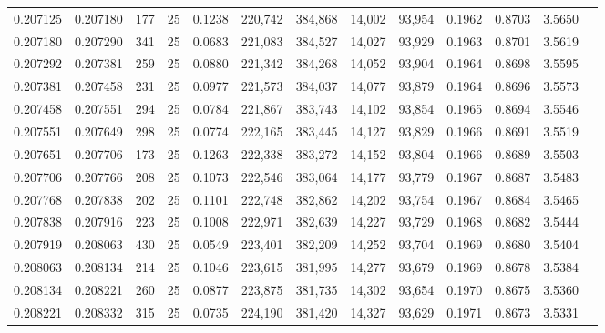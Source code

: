 \begin{tabular}{rrrrrrrrrrrrr}
0.207125 & 0.207180 &   177 &  25 &                                     0.1238 & 220,742 & 384,868 &  14,002 &  93,954 & 0.1962 & 0.8703 & 3.5650 \\
0.207180 & 0.207290 &   341 &  25 &                                     0.0683 & 221,083 & 384,527 &  14,027 &  93,929 & 0.1963 & 0.8701 & 3.5619 \\
0.207292 & 0.207381 &   259 &  25 &                                     0.0880 & 221,342 & 384,268 &  14,052 &  93,904 & 0.1964 & 0.8698 & 3.5595 \\
0.207381 & 0.207458 &   231 &  25 &                                     0.0977 & 221,573 & 384,037 &  14,077 &  93,879 & 0.1964 & 0.8696 & 3.5573 \\
0.207458 & 0.207551 &   294 &  25 &                                     0.0784 & 221,867 & 383,743 &  14,102 &  93,854 & 0.1965 & 0.8694 & 3.5546 \\
0.207551 & 0.207649 &   298 &  25 &                                     0.0774 & 222,165 & 383,445 &  14,127 &  93,829 & 0.1966 & 0.8691 & 3.5519 \\
0.207651 & 0.207706 &   173 &  25 &                                     0.1263 & 222,338 & 383,272 &  14,152 &  93,804 & 0.1966 & 0.8689 & 3.5503 \\
0.207706 & 0.207766 &   208 &  25 &                                     0.1073 & 222,546 & 383,064 &  14,177 &  93,779 & 0.1967 & 0.8687 & 3.5483 \\
0.207768 & 0.207838 &   202 &  25 &                                     0.1101 & 222,748 & 382,862 &  14,202 &  93,754 & 0.1967 & 0.8684 & 3.5465 \\
0.207838 & 0.207916 &   223 &  25 &                                     0.1008 & 222,971 & 382,639 &  14,227 &  93,729 & 0.1968 & 0.8682 & 3.5444 \\
0.207919 & 0.208063 &   430 &  25 &                                     0.0549 & 223,401 & 382,209 &  14,252 &  93,704 & 0.1969 & 0.8680 & 3.5404 \\
0.208063 & 0.208134 &   214 &  25 &                                     0.1046 & 223,615 & 381,995 &  14,277 &  93,679 & 0.1969 & 0.8678 & 3.5384 \\
0.208134 & 0.208221 &   260 &  25 &                                     0.0877 & 223,875 & 381,735 &  14,302 &  93,654 & 0.1970 & 0.8675 & 3.5360 \\
0.208221 & 0.208332 &   315 &  25 &                                     0.0735 & 224,190 & 381,420 &  14,327 &  93,629 & 0.1971 & 0.8673 & 3.5331 \\

\end{tabular}
